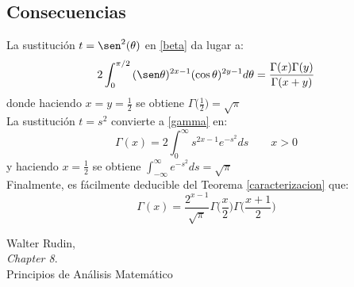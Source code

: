 \documentclass[a4paper, 11pt]{amsart}
\theoremstyle{definition}
\theoremstyle{remark}
\numberwithin{equation}{section}
\begin{document}
  \subsection{Consecuencias}
  La sustitución $t=\sen^2(\theta)$ en \ref{beta} da lugar a:
  \begin{equation}
   2\int_0^{\pi/2}{(\sen\theta)^{2x-1}(\cos\theta)^{2y-1}d\theta} = \frac{\Gamma(x)\Gamma(y)}{\Gamma(x+y)}
  \end{equation}
  donde haciendo $x=y=\frac{1}{2}$ se obtiene $\Gamma\bigg(\frac{1}{2}\bigg) = \sqrt{\pi}$\\
  
  La sustitución $t=s^2$ convierte a \ref{gamma} en:
  \begin{equation}
   \Gamma(x) = 2\int_0^\infty s^{2x-1}e^{-s^2}ds \qquad x>0
  \end{equation}
  y haciendo $x=\frac{1}{2}$ se obtiene $\int_{-\infty}^{\infty} e^{-s^2}ds = \sqrt{\pi}$\\
  
  Finalmente, es fácilmente deducible del Teorema \ref{caracterizacion} que:
  \begin{equation}
   \Gamma(x)= \frac{2^{x-1}}{\sqrt{\pi}}\Gamma\bigg(\frac{x}{2}\bigg)\Gamma\bigg(\frac{x+1}{2}\bigg)
  \end{equation}


  

  
  \newpage
  \begin{thebibliography}{9}

    Walter Rudin,\\
    \emph{Chapter 8}.\\
    Principios de Análisis Matemático
    
  \end{thebibliography}

  
\end{document}
